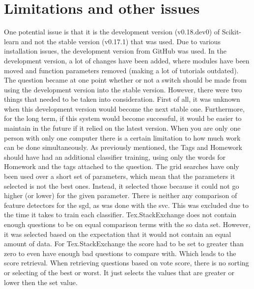 \begin{comment}
\end{comment}


\section{Limitations and other issues}
\label{sec:limitations_and_issues}
One potential issue is that it is the development version (v0.18.dev0) of Scikit-learn and not the stable version (v0.17.1) that was used.
Due to various installation issues, the development version from GitHub was used.
In the development version, a lot of changes have been added, where modules have been moved and function parameters removed (making a lot of tutorials outdated).
The question became at one point whether or not a switch should be made from using the development version into the stable version.
However, there were two things that needed to be taken into consideration.  
First of all, it was unknown when this development version would become the next stable one.
Furthermore, for the long term, if this system would become successful, it would be easier to maintain in the future if it relied on the latest version.
\vspace{0.5em}\newline
When you are only one person with only one computer there is a certain limitation to how much work can be done simultaneously.
As previously mentioned, the Tags and Homework should have had an additional classifier training, using only the words for Homework and the tags attached to the question.
The grid searches have only been used over a short set of parameters, which mean that the parameters it selected is not the best ones.
Instead, it selected those because it could not go higher (or lower) for the given parameter. 
There is neither any comparison of feature detectors for the \gls{sgd}, as was done with the \gls{svc}.
This was excluded due to the time it takes to train each classifier.
\vspace{0.5em}\newline
Tex.StackExchange does not contain enough questions to be on equal comparison terms with the \gls{so} data set. 
However, it was selected based on the expectation that it would not contain an equal amount of data. 
For Tex.StackExchange the score had to be set to greater than zero to even have enough bad questions to compare with.
Which leads to the score retrieval. 
When retrieving questions based on vote score, there is no sorting or selecting of the best or worst. 
It just selects the values that are greater or lower then the set value. 
